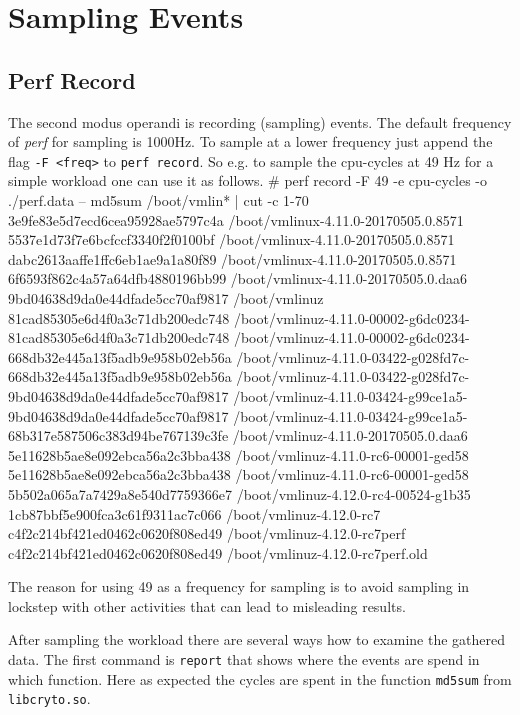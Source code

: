 \chapter{Sampling Events}
\section{Perf Record}
The second modus operandi is recording (sampling) events. The default frequency of {\em perf}
for sampling is 1000Hz. To sample at a lower frequency just append the flag {\tt -F <freq>} to
{\tt perf record}. So e.g. to sample the cpu-cycles at 49 Hz for a simple workload one can use
it as follows.
\starttyping
# perf record -F 49  -e cpu-cycles -o ./perf.data -- md5sum /boot/vmlin* | cut -c 1-70
3e9fe83e5d7ecd6cea95928ae5797c4a  /boot/vmlinux-4.11.0-20170505.0.8571
5537e1d73f7e6bcfccf3340f2f0100bf  /boot/vmlinux-4.11.0-20170505.0.8571
dabc2613aaffe1ffc6eb1ae9a1a80f89  /boot/vmlinux-4.11.0-20170505.0.8571
6f6593f862c4a57a64dfb4880196bb99  /boot/vmlinux-4.11.0-20170505.0.daa6
9bd04638d9da0e44dfade5cc70af9817  /boot/vmlinuz
81cad85305e6d4f0a3c71db200edc748  /boot/vmlinuz-4.11.0-00002-g6dc0234-
81cad85305e6d4f0a3c71db200edc748  /boot/vmlinuz-4.11.0-00002-g6dc0234-
668db32e445a13f5adb9e958b02eb56a  /boot/vmlinuz-4.11.0-03422-g028fd7c-
668db32e445a13f5adb9e958b02eb56a  /boot/vmlinuz-4.11.0-03422-g028fd7c-
9bd04638d9da0e44dfade5cc70af9817  /boot/vmlinuz-4.11.0-03424-g99ce1a5-
9bd04638d9da0e44dfade5cc70af9817  /boot/vmlinuz-4.11.0-03424-g99ce1a5-
68b317e587506c383d94be767139c3fe  /boot/vmlinuz-4.11.0-20170505.0.daa6
5e11628b5ae8e092ebca56a2c3bba438  /boot/vmlinuz-4.11.0-rc6-00001-ged58
5e11628b5ae8e092ebca56a2c3bba438  /boot/vmlinuz-4.11.0-rc6-00001-ged58
5b502a065a7a7429a8e540d7759366e7  /boot/vmlinuz-4.12.0-rc4-00524-g1b35
1cb87bbf5e900fca3c61f9311ac7c066  /boot/vmlinuz-4.12.0-rc7
c4f2c214bf421ed0462c0620f808ed49  /boot/vmlinuz-4.12.0-rc7perf
c4f2c214bf421ed0462c0620f808ed49  /boot/vmlinuz-4.12.0-rc7perf.old
\stoptyping

The reason for using 49 as a frequency for sampling is to avoid
sampling in lockstep with other activities that can lead to misleading
results.

After sampling the workload there are several ways how to examine the
gathered data.  The first command is {\tt report} that shows where the
events are spend in which function. Here as expected the cycles are
spent in the function {\tt md5sum} from {\tt libcryto.so}.

